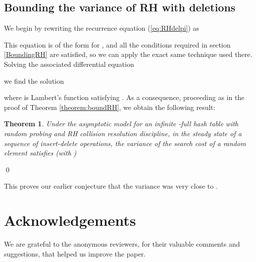 \documentclass[proceedings]{aofa}
\newtheorem{theorem}{Theorem}
\begin{document}
\subsection{Bounding the variance of RH with deletions}
We begin by rewriting the recurrence equation (\ref{eq:RHdelpi}) as

This equation is of the form  for ,
and all the conditions required in section \ref{BoundingRH} are satisfied, so we can apply the exact same technique
used there.
Solving the associated differential equation 

we find the solution

where  is Lambert's function satisfying .
As a consequence,
proceeding as in the proof of Theorem \ref{theorem:boundRH},
we obtain the following result:
\begin{theorem}\label{theorem:boundRHwdel}
Under the asymptotic model for an infinite -full hash table with random
probing and RH collision resolution discipline, 
in the steady state of a sequence of insert-delete operations, the variance of the search 
cost of a random element satisfies
(with )

\end{theorem}
\qed

This proves our earlier conjecture that the variance was very close to .

\section{Acknowledgements}
We are grateful to the anonymous reviewers, for their valuable comments and suggestions, that helped us improve the paper.


\end{document}

